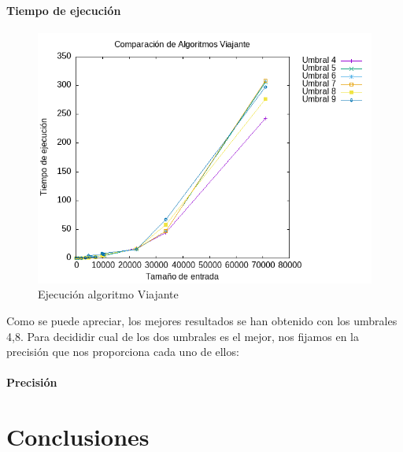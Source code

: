\documentclass[11pt,openany]{book}
\begin{document}
\subsubsection*{Tiempo de ejecución}
\begin{center}
      \begin{figure}[H]
            \centering
            \includegraphics[width=0.7\linewidth]{assets/Img/UmbralP3.png}
            \caption{Ejecución algoritmo Viajante}
            \label{fig:Viajante}
      \end{figure}
\end{center}
Como se puede apreciar, los mejores resultados se han obtenido con los umbrales {4,8}.
Para decididir cual de los dos umbrales es el mejor, nos fijamos en la precisión
que nos proporciona cada uno de ellos:
\subsubsection*{Precisión}



\chapter{Conclusiones}
\end{document}
